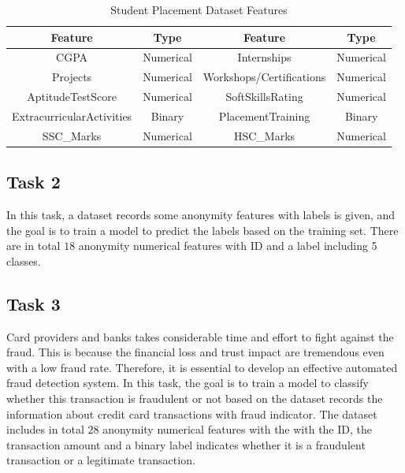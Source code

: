 \documentclass[11pt]{article}
\begin{document}
\begin{table}[H]
  \centering
  \begin{tabular}{|c|c|c|c|}
    \hline
    \textbf{Feature}          & \textbf{Type} & \textbf{Feature}         & \textbf{Type} \\
    \hline
    CGPA                      & Numerical     & Internships              & Numerical     \\
    \hline
    Projects                  & Numerical     & Workshops/Certifications & Numerical     \\
    \hline
    AptitudeTestScore         & Numerical     & SoftSkillsRating         & Numerical     \\
    \hline
    ExtracurricularActivities & Binary        & PlacementTraining        & Binary        \\
    \hline
    SSC\_Marks                & Numerical     & HSC\_Marks               & Numerical     \\
    \hline
  \end{tabular}
  \caption{Student Placement Dataset Features}
  \label{task-1-data}
\end{table}

\subsection{Task 2}

In this task, a dataset records some anonymity features with labels is given, and the goal is to train a model to predict the labels based on the training set. There are in total $18$ anonymity numerical features with ID and a label including 5 classes.

\subsection{Task 3}

Card providers and banks takes considerable time and effort to fight against the fraud. This is because the financial loss and trust impact are tremendous even with a low fraud rate. Therefore, it is essential to develop an effective automated fraud detection system. In this task, the goal is to train a model to classify whether this transaction is fraudulent or not based on the dataset records the information about credit card transactions with fraud indicator. The dataset includes in total $28$ anonymity numerical features with the with the ID, the transaction amount and a binary label indicates whether it is a fraudulent transaction or a legitimate transaction.
\end{document}
